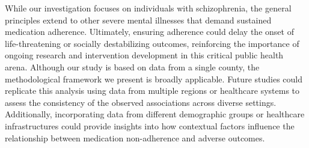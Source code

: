 While our investigation focuses on individuals with schizophrenia, the general principles extend to other severe mental illnesses that demand sustained medication adherence.
Ultimately, ensuring adherence could delay the onset of life-threatening or socially destabilizing outcomes, reinforcing the importance of ongoing research and intervention development in this critical public health arena.
Although our study is based on data from a single county, the methodological framework we present is broadly applicable. Future studies could replicate this analysis using data from multiple regions or healthcare systems to assess the consistency of the observed associations across diverse settings. Additionally, incorporating data from different demographic groups or healthcare infrastructures could provide insights into how contextual factors influence the relationship between medication non-adherence and adverse outcomes.